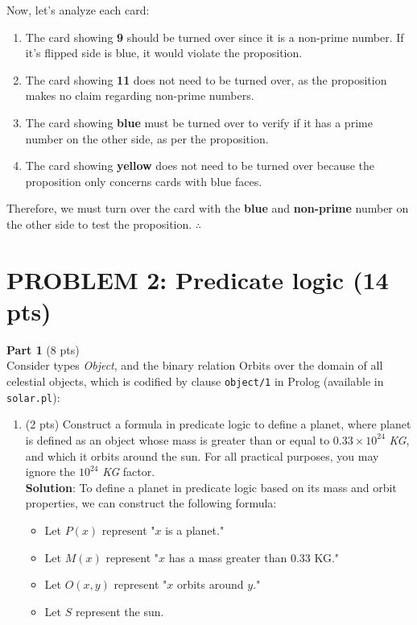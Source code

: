 \documentclass[12pt]{article}
\begin{document}
\begin{spacing}{1.5}
	Now, let's analyze each card:
	\begin{enumerate}
		\item The card showing \textbf{9} should be turned over since it is a non-prime number. If it's flipped side is blue, it would violate the proposition.
		\item The card showing \textbf{11} does not need to be turned over, as the proposition makes no claim regarding non-prime numbers.
		\item The card showing \textbf{blue} must be turned over to verify if it has a prime number on the other side, as per the proposition.
		\item The card showing \textbf{yellow} does not need to be turned over because the proposition only concerns cards with blue faces.\\
	\end{enumerate}
												
	Therefore, we must turn over the card with the \textbf{blue} and \textbf{non-prime} number on the other side to test the proposition. $\therefore$
												
	\newpage
												
								
	\newpage
							    
	\section*{PROBLEM 2: Predicate logic (14 pts)}
												
	\textbf{Part 1} (8 pts)\\
	Consider types \textit{Object}, and the binary relation Orbits over the domain of all celestial objects,
	which is codified by clause \texttt{object/1} in Prolog (available in \texttt{solar.pl}):
											
	\begin{enumerate}
		\item 
		      (2 pts) Construct a formula in predicate logic to define a planet, where planet is defined
		      as an object whose mass is greater than or equal to $0.33\times10^{24}$ \textit{KG}, and which it orbits around the
		      sun. For all practical purposes, you may ignore the $10^{24}$ \textit{KG} factor.\\

		      \textbf{Solution}: To define a planet in predicate logic based on its mass and orbit properties, we can construct the following formula:

		      \begin{itemize}
		      	\item Let $P(x)$ represent "$x$ is a planet."
		      	\item Let $M(x)$ represent "$x$ has a mass greater than 0.33 KG."
		      	\item Let $O(x,y)$ represent "$x$ orbits around $y$."
		      	\item Let $S$ represent the sun.
		      	      

\end{itemize}
\end{enumerate}
\end{spacing}
\end{document}
